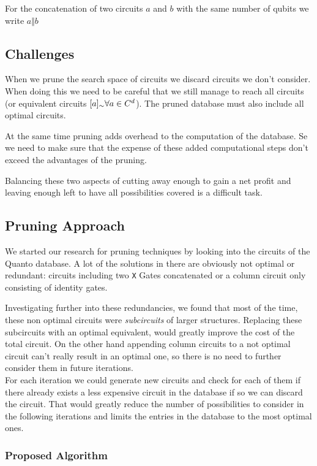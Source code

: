 For the concatenation of two circuits $a$ and $b$ with the same number of qubits we write $a\Vert b$


\subsection{Challenges}
When we prune the search space of circuits we discard circuits we don't consider. When doing this we need to be careful that we still manage to reach all circuits 
(or equivalent circuits $[a]_\sim\space\forall a\in C^d$). The pruned database must also include all optimal circuits.

At the same time pruning adds overhead to the computation of the database. Se we need to make sure that the expense of these added computational steps don't exceed the advantages of the pruning.

Balancing these two aspects of cutting away enough to gain a net profit and leaving enough left to have all possibilities covered is a difficult task.

\subsection{Pruning Approach}
We started our research for pruning techniques by looking into the circuits of the Quanto database. A lot of the solutions in there are obviously not optimal or redundant: circuits including two \texttt{X} Gates concatenated or a column circuit only consisting of identity gates. 

Investigating further into these redundancies, we found that most of the time, these non optimal circuits were \textit{subcircuits} of larger structures. Replacing these subcircuits with an optimal equivalent, would greatly improve the cost of the total circuit. On the other hand appending column circuits to a not optimal circuit can't really result in an optimal one, so there is no need to further consider them in future iterations.\\

For each iteration we could generate new circuits and check for each of them if there already exists a less expensive circuit in the database if so we can discard the circuit. That would greatly reduce the number of possibilities to consider in the following iterations and limits the entries in the database to the most optimal ones.

\subsubsection{Proposed Algorithm}

